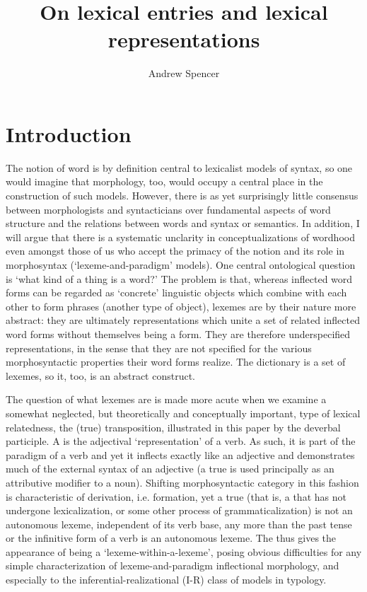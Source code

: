 \documentclass[output=paper]{langsci/langscibook}
\title{On lexical entries and lexical representations}
\author{Andrew Spencer\affiliation{University of Essex}}
\begin{document}



%

\section{Introduction} \label{sec:Spencer:introduction}


The notion of word is by definition central to lexicalist models of syntax, so one would imagine that morphology, too, would occupy a central place in the construction of such models. However, there is as yet surprisingly little consensus between morphologists and syntacticians over fundamental aspects of word structure and the relations between words and syntax or semantics. In addition, I will argue that there is a systematic unclarity in conceptualizations of wordhood even amongst those of us who accept the primacy of the  notion and its role in morphosyntax (`lexeme-and-paradigm' models). One central ontological question is `what kind of a thing is a word?' The problem is that, whereas inflected word forms can be regarded as `concrete' linguistic objects which combine with each other to form phrases (another type of object), lexemes are by their nature more abstract: they are ultimately representations which unite a set of related inflected word forms without themselves being a form. They are therefore underspecified representations, in the sense that they are not specified for the various morphosyntactic properties their word forms realize. The dictionary is a set of lexemes, so it, too, is an abstract construct.

The question of what lexemes are is made more acute when we examine a somewhat neglected, but theoretically and conceptually important, type of lexical relatedness, the (true) transposition, illustrated in this paper by the  deverbal participle. A  is the adjectival `representation' \citep{Haspelmath1996} of a verb. As such, it is part of the paradigm of a verb and yet it inflects exactly like an adjective and demonstrates much of the external syntax of an adjective (a true  is used principally as an attributive modifier to a noun). Shifting morphosyntactic category in this fashion is characteristic of derivation, i.e.  formation, yet a true  (that is, a  that has not undergone lexicalization, or some other process of grammaticalization) is not an autonomous lexeme, independent of its verb base, any more than the past tense or the infinitive form of a verb is an autonomous lexeme. The  thus gives the appearance of being a `lexeme-within-a-lexeme', posing obvious difficulties for any simple characterization of lexeme-and-paradigm inflectional morphology, and especially to the inferential-realizational (I-R) class of models in %
%
typology.
\end{document}
